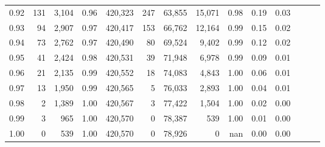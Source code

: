 \begin{tabular}{rrrrrrrrrrrrrr}
0.92 &    131 &  3,104 &  0.96 &  420,323 &      247 &  63,855 &  15,071 &  0.98 &  0.19 &      0.03 \\
0.93 &     94 &  2,907 &  0.97 &  420,417 &      153 &  66,762 &  12,164 &  0.99 &  0.15 &      0.02 \\
0.94 &     73 &  2,762 &  0.97 &  420,490 &       80 &  69,524 &   9,402 &  0.99 &  0.12 &      0.02 \\
0.95 &     41 &  2,424 &  0.98 &  420,531 &       39 &  71,948 &   6,978 &  0.99 &  0.09 &      0.01 \\
0.96 &     21 &  2,135 &  0.99 &  420,552 &       18 &  74,083 &   4,843 &  1.00 &  0.06 &      0.01 \\
0.97 &     13 &  1,950 &  0.99 &  420,565 &        5 &  76,033 &   2,893 &  1.00 &  0.04 &      0.01 \\
0.98 &      2 &  1,389 &  1.00 &  420,567 &        3 &  77,422 &   1,504 &  1.00 &  0.02 &      0.00 \\
0.99 &      3 &    965 &  1.00 &  420,570 &        0 &  78,387 &     539 &  1.00 &  0.01 &      0.00 \\
1.00 &      0 &    539 &  1.00 &  420,570 &        0 &  78,926 &       0 &   nan &  0.00 &      0.00 \\
\bottomrule
\end{tabular}
